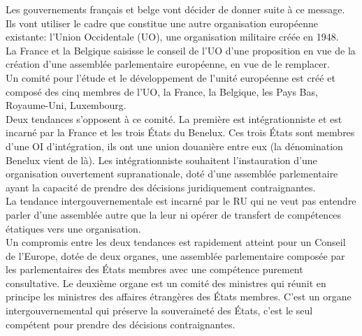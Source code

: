 \documentclass[10pt, a4paper, openany]{book}
\begin{document}
Les gouvernements français et belge vont décider de donner suite à ce message. Ils vont utiliser le cadre que constitue une autre organisation européenne existante: l'Union Occidentale (UO), une organisation militaire créée en 1948. \\
La France et la Belgique saisisse le conseil de l'UO d'une proposition en vue de la création d'une assemblée parlementaire européenne, en vue de le remplacer. \\
Un comité pour l'étude et le développement de l'unité européenne est créé et composé des cinq membres de l'UO, la France, la Belgique, les Pays Bas, Royaume-Uni, Luxembourg. \\
Deux tendances s'opposent à ce comité. La première est intégrationniste et est incarné par la France et les trois États du Benelux. Ces trois États sont membres d'une OI d'intégration, ils ont une union douanière entre eux (la dénomination Benelux vient de là). Les intégrationniste souhaitent l'instauration d'une organisation ouvertement supranationale, doté d'une assemblée parlementaire ayant la capacité de prendre des décisions juridiquement contraignantes. \\
La tendance intergouvernementale est incarné par le RU qui ne veut pas entendre parler d'une assemblée autre que la leur ni opérer de transfert de compétences étatiques vers une organisation. \\
Un compromis entre les deux tendances est rapidement atteint pour un Conseil de l'Europe, dotée de deux organes, une assemblée parlementaire composée par les parlementaires des États membres avec une compétence purement consultative. Le deuxième organe est un comité des ministres qui réunit en principe les ministres des affaires étrangères des États membres. C'est un organe intergouvernemental qui préserve la souveraineté des États, c'est le seul compétent pour prendre des décisions contraignantes.
\end{document}
